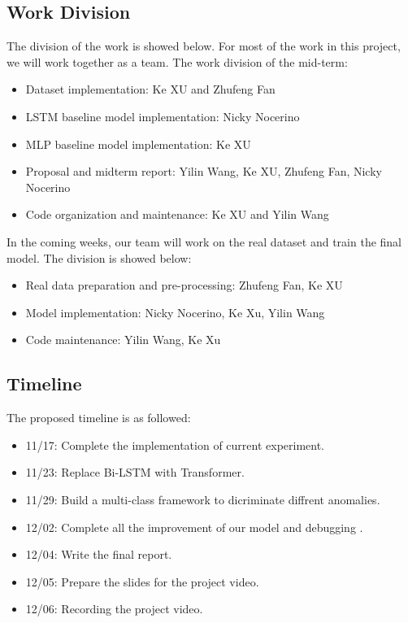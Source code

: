 \documentclass{article}
\begin{document}
\subsection{Work Division}
The division of the work is showed below. For most of the work in this project, we will work together as a team.
The work division of the mid-term:
\begin{itemize}
    \item Dataset implementation: Ke XU and Zhufeng Fan
    \item LSTM baseline model implementation: Nicky Nocerino
    \item MLP baseline model implementation: Ke XU
    \item Proposal and midterm report: Yilin Wang, Ke XU, Zhufeng Fan, Nicky Nocerino
    \item Code organization and maintenance: Ke XU and Yilin Wang
\end{itemize}
In the coming weeks, our team will work on the real dataset and train the final model. The division is showed below:
\begin{itemize}
    \item Real data preparation and pre-processing: Zhufeng Fan, Ke XU
    \item Model implementation: Nicky Nocerino, Ke Xu, Yilin Wang
    \item Code maintenance: Yilin Wang, Ke Xu 
\end{itemize}

\subsection{Timeline}
The proposed timeline is as followed:
\begin{itemize}
    \item 
        11/17: Complete the implementation of current experiment.
    \item
        11/23: Replace Bi-LSTM with Transformer.
    \item
        11/29: Build a multi-class framework to dicriminate diffrent anomalies.
    \item
        12/02: Complete all the improvement of our model and debugging .
    \item
        12/04: Write the final report.
    \item 
        12/05: Prepare the slides for the project video.
    \item
        12/06: Recording the project video.
\end{itemize}

{


}
\end{document}
